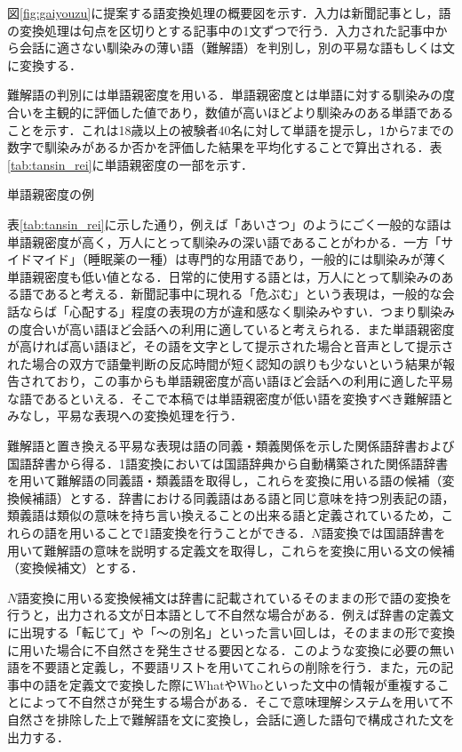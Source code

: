 \documentclass[japanese]{jnlp_1.4}
\begin{document}
図\ref{fig:gaiyouzu}に提案する語変換処理の概要図を示す．入力は新聞記事とし，語の変換処理は句点を区切りとする記事中の1文ずつで行う．入力された記事中から会話に適さない馴染みの薄い語（難解語）を判別し，別の平易な語もしくは文に変換する．

難解語の判別には単語親密度\cite{Book_01}を用いる．単語親密度とは単語に対する馴染みの度合いを主観的に評価した値であり，数値が高いほどより馴染みのある単語であることを示す．これは18歳以上の被験者40名に対して単語を提示し，1から7までの数字で馴染みがあるか否かを評価した結果を平均化することで算出される．表\ref{tab:tansin_rei}に単語親密度の一部を示す．

\begin{table}[b]
\vspace{-1\Cvs}
\caption{単語親密度の例}
\label{tab:tansin_rei}

\end{table}

表\ref{tab:tansin_rei}に示した通り，例えば「あいさつ」のようにごく一般的な語は単語親密度が高く，万人にとって馴染みの深い語であることがわかる．一方「サイドマイド」（睡眠薬の一種）は専門的な用語であり，一般的には馴染みが薄く単語親密度も低い値となる．日常的に使用する語とは，万人にとって馴染みのある語であると考える．新聞記事中に現れる「危ぶむ」という表現は，一般的な会話ならば「心配する」程度の表現の方が違和感なく馴染みやすい．つまり馴染みの度合いが高い語ほど会話への利用に適していると考えられる．また単語親密度が高ければ高い語ほど，その語を文字として提示された場合と音声として提示された場合の双方で語彙判断の反応時間が短く認知の誤りも少ないという結果が報告されており\cite{Article_20,Article_21,Book_05}，この事からも単語親密度が高い語ほど会話への利用に適した平易な語であるといえる．そこで本稿では単語親密度が低い語を変換すべき難解語とみなし，平易な表現への変換処理を行う．

難解語と置き換える平易な表現は語の同義・類義関係を示した関係語辞書\cite{Article_10,Article_11}および国語辞書から得る．1語変換においては国語辞典から自動構築された関係語辞書を用いて難解語の同義語・類義語を取得し，これらを変換に用いる語の候補（変換候補語）とする．辞書における同義語はある語と同じ意味を持つ別表記の語，類義語は類似の意味を持ち言い換えることの出来る語と定義されているため，これらの語を用いることで1語変換を行うことができる．$N$語変換では国語辞書を用いて難解語の意味を説明する定義文を取得し，これらを変換に用いる文の候補（変換候補文）とする．

$N$語変換に用いる変換候補文は辞書に記載されているそのままの形で語の変換を行うと，出力される文が日本語として不自然な場合がある．例えば辞書の定義文に出現する「転じて」や「〜の別名」といった言い回しは，そのままの形で変換に用いた場合に不自然さを発生させる要因となる．このような変換に必要の無い語を不要語と定義し，不要語リストを用いてこれらの削除を行う．また，元の記事中の語を定義文で変換した際にWhatやWhoといった文中の情報が重複することによって不自然さが発生する場合がある．そこで意味理解システム\cite{Article_03}を用いて不自然さを排除した上で難解語を文に変換し，会話に適した語句で構成された文を
出力する．
\end{document}
